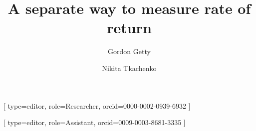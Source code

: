 

\let\WriteBookmarks\relax
\def\floatpagepagefraction{1}
\def\textpagefraction{.001}



\title [mode = title]{\textbf{A separate way to measure rate of return}}                      




%
\author[1]{Gordon Getty}[
                        type=editor,
                        role=Researcher,
                        orcid=0000-0002-0939-6932
                        ]

\cormark[1]

\author[2]{Nikita Tkachenko}[
                    type=editor,
                    role=Assistant,
                    orcid=0009-0003-8681-3335
]








